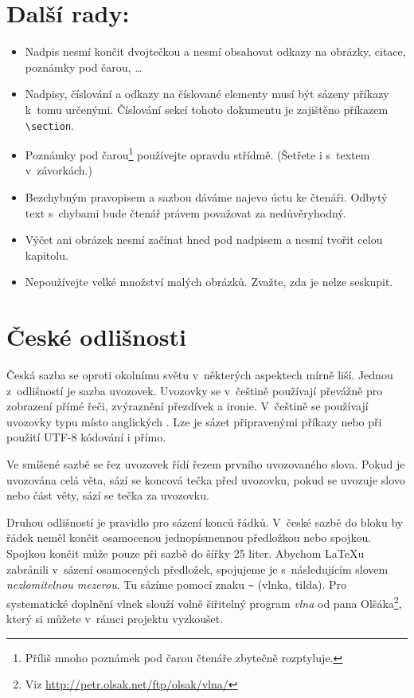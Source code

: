 \documentclass[a4paper, twocolumn, 10pt]{article}
\begin{document}
\section{Další rady:}
\label{sec:rady}
\begin{itemize}
\item Nadpis nesmí končit dvojtečkou a nesmí obsahovat odkazy na obrázky, citace, poznámky pod čarou, \dots

\item Nadpisy, číslování a odkazy na číslované elementy musí být sázeny příkazy k~tomu určenými.
Číslování sekcí tohoto dokumentu je zajištěno příkazem \verb|\section|.

\item Poznámky pod čarou\footnote{Příliš mnoho poznámek pod čarou čtenáře zbytečně rozptyluje.} používejte opravdu střídmě.
(Šetřete i s~textem v~závorkách.)

\item Bezchybným pravopisem a sazbou dáváme najevo úctu ke čtenáři.
Odbytý text s~chybami bude čtenář právem považovat za nedůvěryhodný.

\item Výčet ani obrázek nesmí začínat hned pod nadpisem a nesmí tvořit celou kapitolu.

\item Nepoužívejte velké množství malých obrázků.
Zvažte, zda je nelze seskupit.
\end{itemize}

\section{České odlišnosti}
Česká sazba se oproti okolnímu světu v~některých aspektech mírně liší.
Jednou z~odlišností je sazba uvozovek.
Uvozovky se v~češtině používají převážně pro zobrazení přímé řeči, zvýraznění přezdívek a ironie.
V~češtině se používají uvozovky typu  místo anglických .
Lze je sázet připravenými příkazy nebo při použití UTF-8 kódování i přímo.

Ve smíšené sazbě se řez uvozovek řídí řezem prvního uvozovaného slova.
Pokud je uvozována celá věta, sází se koncová tečka před uvozovku, pokud se uvozuje slovo nebo část věty, sází se tečka za uvozovku.

Druhou odlišností je pravidlo pro sázení konců řádků.
V~české sazbě do bloku by řádek neměl končit osamocenou jednopísmennou předložkou nebo spojkou.
Spojkou  končit může pouze při sazbě do šířky 25 liter.
Abychom \LaTeX u zabránili v~sázení osamocených předložek, spojujeme je s~následujícím slovem {\textit{nezlomitelnou mezerou}}.
Tu sázíme pomocí znaku \verb|~| (vlnka, tilda).
Pro systematické doplnění vlnek slouží volně šiřitelný program {\textit{vlna}} od pana Olšáka\footnote{Viz \url{http://petr.olsak.net/ftp/olsak/vlna/}}, který si můžete v~rámci projektu vyzkoušet.
\end{document}
